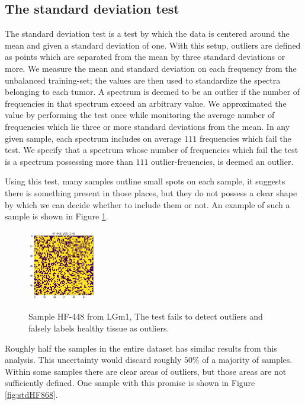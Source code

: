\subsection{The standard deviation test}

The standard deviation test is a test by which the data is centered around the mean and given a standard deviation of one. With this setup, outliers are defined as points which are separated from the mean by three standard deviations or more. We measure the mean and standard deviation on each frequency from the unbalanced training-set; the values are then used to standardize the spectra belonging to each tumor. A spectrum is deemed to be an outlier if the number of frequencies in that spectrum exceed an arbitrary value. We approximated the value by performing the test once while monitoring the average number of frequencies which lie three or more standard deviations from the mean. In any given sample, each spectrum includes on average $111$ frequencies which fail the test. We specify that a spectrum whose number of frequencies which fail the test is a spectrum possessing more than $111$ outlier-freuencies, is deemed an outlier. 

Using this test, many samples outline small spots on each sample, it suggests there is something present in those places, but they do not possess a clear shape by which we can decide whether to include them or not. An example of such a sample is shown in Figure \ref{fig:stdHF448}.

\begin{figure}[H]

    \centering
{\includegraphics[width=3cm]{images/STDtest/LGm-1/HF-448_V5B_1.h5_3.png} }
\caption{Sample HF-448 from LGm1, The test fails to detect outliers and falsely labels healthy tissue as outliers.\label{fig:stdHF448}}%

\end{figure}

Roughly half the samples in the entire dataset has similar results from this analysis. This uncertainty would discard roughly $50\%$ of a majority of samples. Within some samples there are clear areas of outliers, but those areas are not sufficiently defined. One sample with this promise is shown in Figure \ref{fig:stdHF868}.

